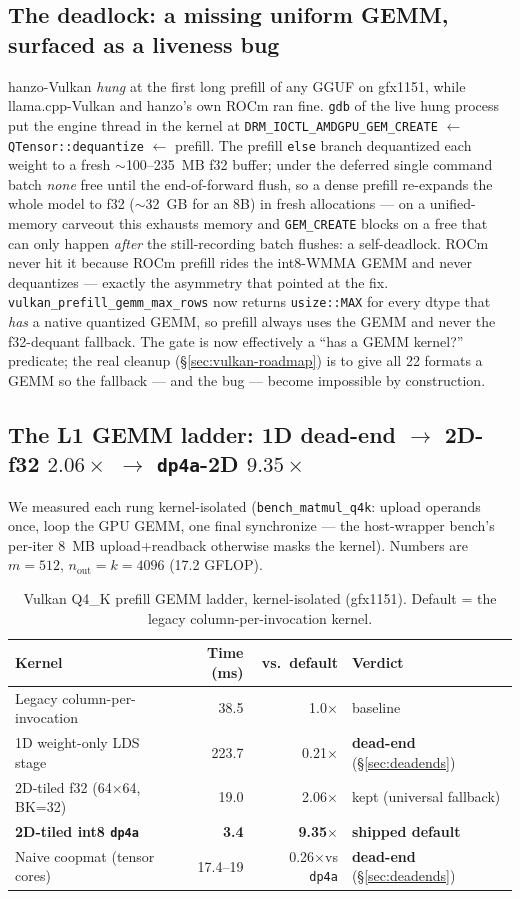 \documentclass[11pt]{article}
\newcommand{\x}{\ensuremath{\times}}
\newcommand{\dpa}{\texttt{dp4a}}
\begin{document}
\subsection{The deadlock: a missing uniform GEMM, surfaced as a liveness bug}
hanzo-Vulkan \emph{hung} at the first long prefill of any GGUF on gfx1151, while llama.cpp-Vulkan
and hanzo's own ROCm ran fine. \texttt{gdb} of the live hung process put the engine thread in the
kernel at \texttt{DRM\_IOCTL\_AMDGPU\_GEM\_CREATE} $\leftarrow$ \texttt{QTensor::dequantize}
$\leftarrow$ prefill. The prefill \texttt{else} branch dequantized each weight to a fresh
$\sim$100--235~MB f32 buffer; under the deferred single command batch \emph{none} free until the
end-of-forward flush, so a dense prefill re-expands the whole model to f32 ($\sim$32~GB for an 8B)
in fresh allocations --- on a unified-memory carveout this exhausts memory and \texttt{GEM\_CREATE}
blocks on a free that can only happen \emph{after} the still-recording batch flushes: a
self-deadlock. ROCm never hit it because ROCm prefill rides the int8-WMMA GEMM and never
dequantizes --- exactly the asymmetry that pointed at the fix. \texttt{vulkan\_prefill\_gemm\_max\_rows}
now returns \texttt{usize::MAX} for every dtype that \emph{has} a native quantized GEMM, so prefill
always uses the GEMM and never the f32-dequant fallback. The gate is now effectively a ``has a GEMM
kernel?'' predicate; the real cleanup (\S\ref{sec:vulkan-roadmap}) is to give all 22 formats a GEMM
so the fallback --- and the bug --- become impossible by construction.

\subsection{The L1 GEMM ladder: 1D dead-end $\to$ 2D-f32 $2.06\x$ $\to$ \dpa{}-2D $9.35\x$}
We measured each rung kernel-isolated (\texttt{bench\_matmul\_q4k}: upload operands once, loop the
GPU GEMM, one final synchronize --- the host-wrapper bench's per-iter 8~MB upload+readback
otherwise masks the kernel). Numbers are $m{=}512,\,n_{\text{out}}{=}k{=}4096$ (17.2 GFLOP).

\begin{table}[h]
\centering
\caption{Vulkan Q4\_K prefill GEMM ladder, kernel-isolated (gfx1151). Default = the legacy
column-per-invocation kernel.}
\small
\begin{tabular}{l r r l}
\toprule
Kernel & Time (ms) & vs.\ default & Verdict \\
\midrule
Legacy column-per-invocation & 38.5 & 1.0\x & baseline \\
1D weight-only LDS stage & 223.7 & 0.21\x & \textbf{dead-end} (\S\ref{sec:deadends}) \\
2D-tiled f32 (64$\times$64, BK=32) & 19.0 & 2.06\x & kept (universal fallback) \\
\textbf{2D-tiled int8 \dpa{}} & \textbf{3.4} & \textbf{9.35\x} & \textbf{shipped default} \\
Naive coopmat (tensor cores) & 17.4--19 & 0.26\x vs \dpa{} & \textbf{dead-end} (\S\ref{sec:deadends}) \\
\bottomrule
\end{tabular}
\end{table}
\end{document}
